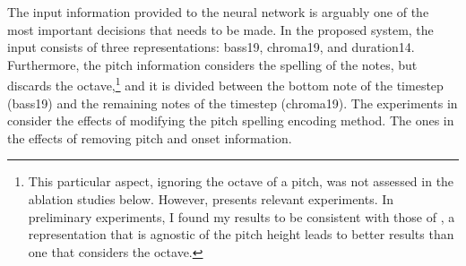 
The input information provided to the neural network is
arguably one of the most important decisions that needs to
be made. In the proposed system, the input consists of three
representations: \gls{bass19}, \gls{chroma19}, and
\gls{duration14}. Furthermore, the pitch information
considers the spelling of the notes, but discards the
octave,\footnote{This particular aspect, ignoring the octave
of a pitch, was not assessed in the ablation studies below.
However, \textcite{micchi2020not} presents relevant
experiments. In preliminary experiments, I found my results
to be consistent with those of \textcite{micchi2020not}, a
representation that is agnostic of the pitch height leads to
better results than one that considers the octave.} and it
is divided between the bottom note of the timestep
(\gls{bass19}) and the remaining notes of the timestep
(\gls{chroma19}). The experiments in
 consider the
effects of modifying the pitch spelling encoding method. The
ones in  the effects of
removing pitch and onset information.
